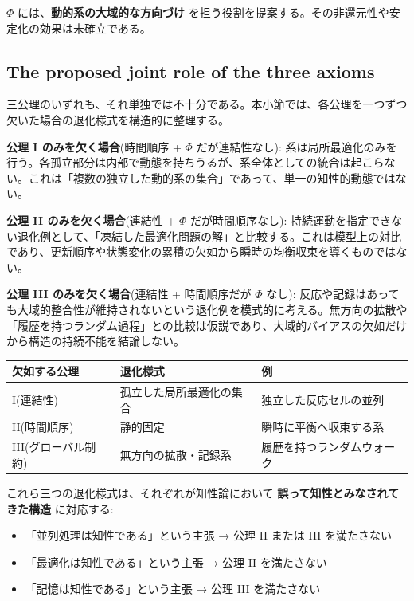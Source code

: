 $\Phi$ には、\textbf{動的系の大域的な方向づけ} を担う役割を提案する。その非還元性や安定化の効果は未確立である。

\subsection{The proposed joint role of the three axioms}


三公理のいずれも、それ単独では不十分である。本小節では、各公理を一つずつ欠いた場合の退化様式を構造的に整理する。

\textbf{公理 I のみを欠く場合}(時間順序 + $\Phi$ だが連結性なし):
系は局所最適化のみを行う。各孤立部分は内部で動態を持ちうるが、系全体としての統合は起こらない。これは「複数の独立した動的系の集合」であって、単一の知性的動態ではない。

\textbf{公理 II のみを欠く場合}(連結性 + $\Phi$ だが時間順序なし):
持続運動を指定できない退化例として、「凍結した最適化問題の解」と比較する。これは模型上の対比であり、更新順序や状態変化の累積の欠如から瞬時の均衡収束を導くものではない。

\textbf{公理 III のみを欠く場合}(連結性 + 時間順序だが $\Phi$ なし):
反応や記録はあっても大域的整合性が維持されないという退化例を模式的に考える。無方向の拡散や「履歴を持つランダム過程」との比較は仮説であり、大域的バイアスの欠如だけから構造の持続不能を結論しない。

\begin{table}[H]
\centering
\small
\begin{tabularx}{\textwidth}{>{\raggedright\arraybackslash}X>{\raggedright\arraybackslash}X>{\raggedright\arraybackslash}X}
\toprule
欠如する公理 & 退化様式 & 例 \\
\midrule
I(連結性) & 孤立した局所最適化の集合 & 独立した反応セルの並列 \\
II(時間順序) & 静的固定 & 瞬時に平衡へ収束する系 \\
III(グローバル制約) & 無方向の拡散・記録系 & 履歴を持つランダムウォーク \\
\bottomrule
\end{tabularx}
\end{table}


これら三つの退化様式は、それぞれが知性論において \textbf{誤って知性とみなされてきた構造} に対応する:

\begin{itemize}
\item 「並列処理は知性である」という主張 → 公理 II または III を満たさない
\item 「最適化は知性である」という主張 → 公理 II を満たさない
\item 「記憶は知性である」という主張 → 公理 III を満たさない
\end{itemize}


